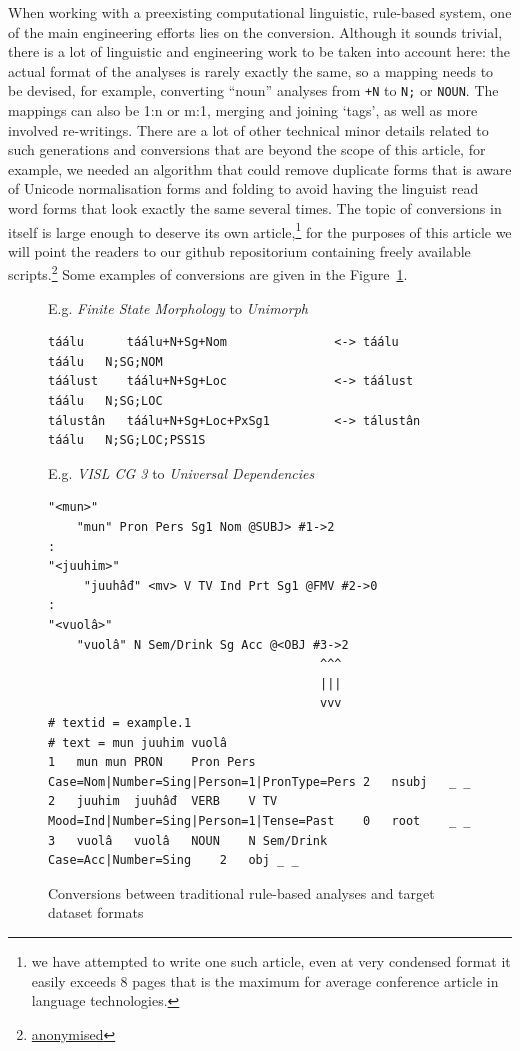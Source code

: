 \documentclass[free]{flammie}
\begin{document}
When working with a preexisting computational linguistic, rule-based system, one
of the main engineering efforts lies on the conversion. Although it sounds
trivial, there is a lot of linguistic and engineering work to be taken into
account here: the actual format of the analyses is rarely exactly the same, so a
mapping needs to be devised, for example, converting ``noun'' analyses from
\texttt{+N} to \texttt{N;} or \texttt{NOUN}. The mappings can also be 1:n or
m:1, merging and joining `tags', as well as more involved re-writings.  There
are a lot of other technical minor details related to such generations and
conversions that are beyond the scope of this article, for example, we needed an
algorithm that could remove duplicate forms that is aware of Unicode
normalisation forms and folding to avoid having the linguist read word forms
that look exactly the same several times.  The topic of conversions in itself is
large enough to deserve its own article,\footnote{we have attempted to write one
such article, even at very condensed format it easily exceeds 8 pages that is
the maximum for average conference article in language technologies.} for the
purposes of this article we will point the readers to our github repositorium
containing freely available scripts.\footnote{\url{anonymised}} Some examples of
conversions are given in the Figure~\ref{fig:conversions}.

\begin{figure}
E.g. \textit{Finite State Morphology} to \textit{Unimorph}
    \begin{verbatim}
táálu      táálu+N+Sg+Nom               <-> táálu      táálu   N;SG;NOM
táálust    táálu+N+Sg+Loc               <-> táálust    táálu   N;SG;LOC
tálustân   táálu+N+Sg+Loc+PxSg1         <-> tálustân   táálu   N;SG;LOC;PSS1S
    \end{verbatim}
E.g. \textit{VISL CG 3} to \textit{Universal Dependencies}
\begin{verbatim}
"<mun>"
    "mun" Pron Pers Sg1 Nom @SUBJ> #1->2
:
"<juuhim>"
     "juuhâđ" <mv> V TV Ind Prt Sg1 @FMV #2->0
:
"<vuolâ>"
    "vuolâ" N Sem/Drink Sg Acc @<OBJ #3->2
                                      ^^^
                                      |||
                                      vvv
# textid = example.1
# text = mun juuhim vuolâ
1	mun	mun	PRON	Pron Pers	Case=Nom|Number=Sing|Person=1|PronType=Pers	2	nsubj	_ _
2	juuhim	juuhâđ	VERB	V TV	Mood=Ind|Number=Sing|Person=1|Tense=Past	0	root	_ _
3	vuolâ	vuolâ	NOUN	N Sem/Drink	Case=Acc|Number=Sing	2	obj	_ _
\end{verbatim}
    \caption{Conversions between traditional rule-based analyses and target dataset formats
    \label{fig:conversions}}
\end{figure}
\end{document}
